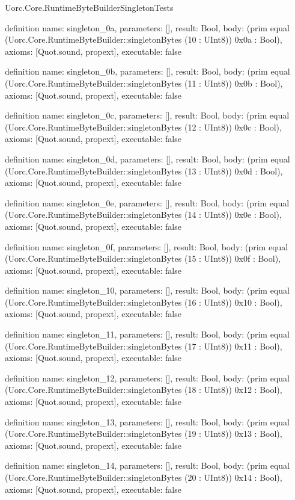 \begin{lexlean}{Uorc.Core.RuntimeByteBuilderSingletonTests}
\begin{semanticmodule}
definition{
  name: singleton_0a,
  parameters: [],
  result: Bool,
  body: (prim equal (Uorc.Core.RuntimeByteBuilder::singletonBytes (10 : UInt8)) 0x0a : Bool),
  axioms: [Quot.sound, propext],
  executable: false
}

definition{
  name: singleton_0b,
  parameters: [],
  result: Bool,
  body: (prim equal (Uorc.Core.RuntimeByteBuilder::singletonBytes (11 : UInt8)) 0x0b : Bool),
  axioms: [Quot.sound, propext],
  executable: false
}

definition{
  name: singleton_0c,
  parameters: [],
  result: Bool,
  body: (prim equal (Uorc.Core.RuntimeByteBuilder::singletonBytes (12 : UInt8)) 0x0c : Bool),
  axioms: [Quot.sound, propext],
  executable: false
}

definition{
  name: singleton_0d,
  parameters: [],
  result: Bool,
  body: (prim equal (Uorc.Core.RuntimeByteBuilder::singletonBytes (13 : UInt8)) 0x0d : Bool),
  axioms: [Quot.sound, propext],
  executable: false
}

definition{
  name: singleton_0e,
  parameters: [],
  result: Bool,
  body: (prim equal (Uorc.Core.RuntimeByteBuilder::singletonBytes (14 : UInt8)) 0x0e : Bool),
  axioms: [Quot.sound, propext],
  executable: false
}

definition{
  name: singleton_0f,
  parameters: [],
  result: Bool,
  body: (prim equal (Uorc.Core.RuntimeByteBuilder::singletonBytes (15 : UInt8)) 0x0f : Bool),
  axioms: [Quot.sound, propext],
  executable: false
}

definition{
  name: singleton_10,
  parameters: [],
  result: Bool,
  body: (prim equal (Uorc.Core.RuntimeByteBuilder::singletonBytes (16 : UInt8)) 0x10 : Bool),
  axioms: [Quot.sound, propext],
  executable: false
}

definition{
  name: singleton_11,
  parameters: [],
  result: Bool,
  body: (prim equal (Uorc.Core.RuntimeByteBuilder::singletonBytes (17 : UInt8)) 0x11 : Bool),
  axioms: [Quot.sound, propext],
  executable: false
}

definition{
  name: singleton_12,
  parameters: [],
  result: Bool,
  body: (prim equal (Uorc.Core.RuntimeByteBuilder::singletonBytes (18 : UInt8)) 0x12 : Bool),
  axioms: [Quot.sound, propext],
  executable: false
}

definition{
  name: singleton_13,
  parameters: [],
  result: Bool,
  body: (prim equal (Uorc.Core.RuntimeByteBuilder::singletonBytes (19 : UInt8)) 0x13 : Bool),
  axioms: [Quot.sound, propext],
  executable: false
}

definition{
  name: singleton_14,
  parameters: [],
  result: Bool,
  body: (prim equal (Uorc.Core.RuntimeByteBuilder::singletonBytes (20 : UInt8)) 0x14 : Bool),
  axioms: [Quot.sound, propext],
  executable: false
}


\end{semanticmodule}
\end{lexlean}
